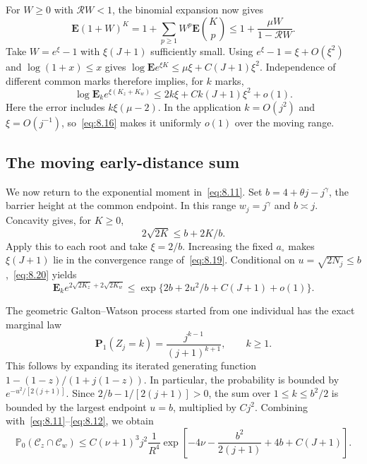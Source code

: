 \documentclass[11pt,letterpaper,reqno]{amsart}
\numberwithin{equation}{section}
\theoremstyle{remark}
\begin{document}
For $W\ge0$ with $\mathcal RW<1$, the binomial expansion now gives
\begin{equation}\label{eq:8.19}
\mathbf E(1+W)^K
=1+\sum_{p\ge1}W^p\mathbf E\binom Kp
\le1+\frac{\mu W}{1-\mathcal RW}.
\end{equation}
Take $W=e^\xi-1$ with $\xi(J+1)$ sufficiently small. Using $e^\xi-1=\xi+O(\xi^2)$ and $\log(1+x)\le x$ gives $\log\mathbf E e^{\xi K}\le\mu\xi+C(J+1)\xi^2$. Independence of different common marks therefore implies, for $k$ marks,
\begin{equation}\label{eq:8.20}
\log\mathbf E_k e^{\xi(K_z+K_w)}
\le2k\xi+Ck(J+1)\xi^2+o(1).
\end{equation}
Here the error includes $k\xi(\mu-2)$. In the application $k=O(j^2)$ and $\xi=O(j^{-1})$, so~\eqref{eq:8.16} makes it uniformly $o(1)$ over the moving range.

\subsection{The moving early-distance sum}\label{sec:earlysum}
We now return to the exponential moment in~\eqref{eq:8.11}. Set $b=4+\theta j-j^\gamma$, the barrier height at the common endpoint. In this range $w_j=j^\gamma$ and $b\asymp j$. Concavity gives, for $K\ge0$,
\begin{equation}\label{eq:8.21}
2\sqrt{2K}\le b+2K/b.
\end{equation}
Apply this to each root and take $\xi=2/b$. Increasing the fixed $a_\circ$ makes $\xi(J+1)$ lie in the convergence range of~\eqref{eq:8.19}. Conditional on $u=\sqrt{2N_j}\le b$,~\eqref{eq:8.20} yields
\begin{equation}\label{eq:8.22}
\mathbf E_k e^{2\sqrt{2K_z}+2\sqrt{2K_w}}
\le\exp\{2b+2u^2/b+C(J+1)+o(1)\}.
\end{equation}

The geometric Galton--Watson process started from one individual has the exact marginal law
\begin{equation}\label{eq:8.23}
\mathbf P_1(Z_j=k)=\frac{j^{k-1}}{(j+1)^{k+1}},\qquad k\ge1.
\end{equation}
This follows by expanding its iterated generating function
$1-(1-z)/(1+j(1-z))$. In particular, the probability is bounded by
$e^{-u^2/[2(j+1)]}$. Since $2/b-1/[2(j+1)]>0$, the sum over
$1\le k\le b^2/2$ is bounded by the largest endpoint $u=b$, multiplied by $Cj^2$. Combining with~\eqref{eq:8.11}--\eqref{eq:8.12}, we obtain
\begin{equation}\label{eq:8.24}
\mathbb P_0(\mathcal C_z\cap\mathcal C_w)
\le C(\nu+1)^3j^2\frac{1}{R^4}
\exp\left[-4\nu-\frac{b^2}{2(j+1)}+4b+C(J+1)\right].
\end{equation}
\end{document}
